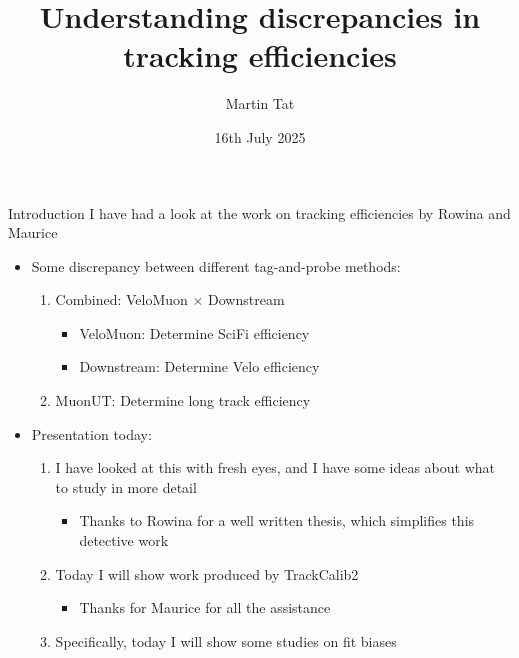 \documentclass[xcolor={dvipsnames}]{beamer}
\title[Heidelberg tracking meeting]{Understanding discrepancies in tracking efficiencies}
\author[Martin Tat]{Martin Tat}
\institute[Heidelberg]{Heidelberg University}
\date{16th July 2025}
\begin{document}
\begin{frame}
  \titlepage
\end{frame}


\begin{frame}{Introduction}
  \vspace{0.0cm}
  {\Large I have had a look at the work on tracking efficiencies by Rowina and Maurice}
  \vspace{0.2cm}
  \begin{itemize}
    \setlength\itemsep{0.8em}
    \item{Some discrepancy between different tag-and-probe methods:}
    \begin{enumerate}
      \item{Combined: VeloMuon $\times$ Downstream}
      \begin{itemize}
        \item{VeloMuon: Determine SciFi efficiency}
        \item{Downstream: Determine Velo efficiency}
      \end{itemize}
      \item{MuonUT: Determine long track efficiency}
    \end{enumerate}
    \item{Presentation today:}
    \begin{enumerate}
      \item{I have looked at this with fresh eyes, and I have some ideas about what to study in more detail}
      \begin{itemize}
        \item{Thanks to Rowina for a well written thesis, which simplifies this detective work}
      \end{itemize}
      \item{Today I will show work produced by TrackCalib2}
      \begin{itemize}
        \item{Thanks for Maurice for all the assistance}
      \end{itemize}
      \item{Specifically, today I will show some studies on fit biases}
    \end{enumerate}
  \end{itemize}
\end{frame}
\end{document}
